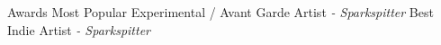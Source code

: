 \begin{rubric}{Awards}
      \entry*[2016]
         \prefix{}
         Most Popular Experimental / Avant Garde Artist \textit{- Sparkspitter}
      \entry*[2014]
         \prefix{}
         Best Indie Artist \textit{- Sparkspitter}
\end{rubric}
